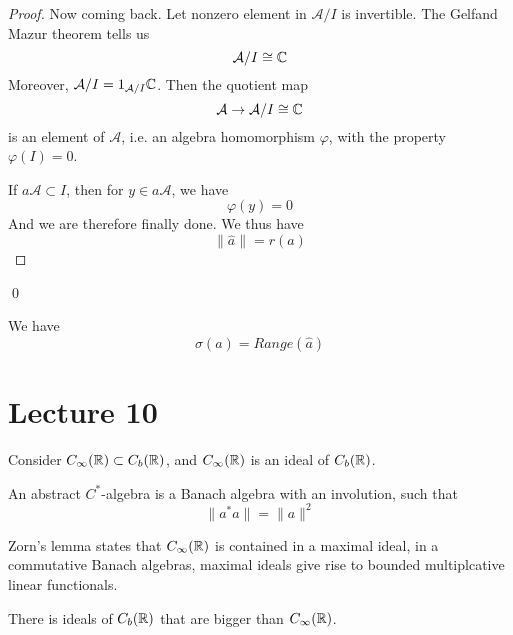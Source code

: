 \begin{proof}
    Now coming back. Let nonzero element in $\mathcal{A}/I$ is invertible. The Gelfand Mazur theorem tells us
    \begin{equation*}
        \mathcal{A}/I\cong \mathbb{C}
    \end{equation*}
    Moreover, $\mathcal{A}/I=1_{\mathcal{A}/I}\mathbb{C}$. Then the quotient map
    \begin{equation*}
        \mathcal{A}\to\mathcal{A}/I\cong\mathbb{C}
    \end{equation*}
    is an element of $\mathcal{A}$, i.e. an algebra homomorphism $\varphi$, with the property $\varphi(I)=0$.

    If $a\mathcal{A}\subset I$, then for $y\in a\mathcal{A}$, we have
    \begin{equation*}
        \varphi(y)=0
    \end{equation*}
    And we are therefore finally done. We thus have
    \begin{equation*}
        \|\widehat{a}\|=r(a)
    \end{equation*}
\end{proof}
\qed

\begin{corollary}
    We have
    \begin{equation*}
        \sigma(a)=Range(\widehat{a})
    \end{equation*}
\end{corollary}

\section{Lecture 10}
Consider $C_\infty(\mathbb{R})\subset C_b(\mathbb{R})$, and $C_\infty(\mathbb{R})$ is an ideal of $C_b(\mathbb{R})$.

\begin{definition}
    An abstract $C^*$-algebra is a Banach algebra with an involution, such that 
    \begin{equation*}
        \|a^*a\|=\|a\|^2
    \end{equation*}
\end{definition}
\begin{remark}
    Zorn's lemma states that $C_\infty(\mathbb{R})$ is contained in a maximal ideal, in a commutative Banach algebras, maximal ideals give rise to bounded multiplcative linear functionals.
\end{remark}
\begin{remark}
    There is ideals of $C_b(\mathbb{R})$ that are bigger than $C_\infty(\mathbb{R})$.
\end{remark}

